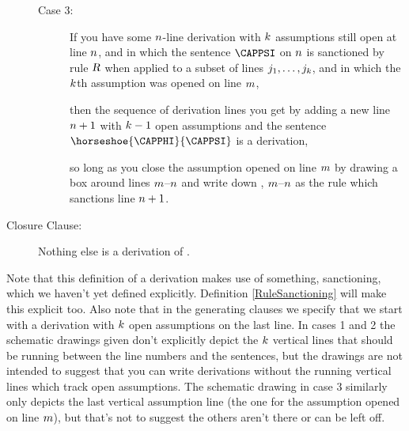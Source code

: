 \begin{majorILnc}{}
\begin{description}
\begin{description}
\item[Case 3:] If you have some $n$-line derivation with $k$ assumptions still open at line $n$, and in which the sentence $\CAPPSI$ on $n$ is sanctioned by rule $\textsl{R}$ when applied to a subset of lines $j_1,\ldots,j_k$, and in which the $k$th assumption was opened on line $m$, 
\begin{gproofnn}
\glinend{}{}{}
\glinend{}{$\qquad\vdots$}{}
\glinend{}{}{}
\galineNCnd{}{}{}
\galineNCnd{}{$\qquad\vdots$}{}
\galineNCnd{}{}{}
\end{gproofnn}
then the sequence of derivation lines you get by adding a new line $n+1$ with $k-1$ open assumptions and the sentence $\horseshoe{\CAPPHI}{\CAPPSI}$ is a derivation,
\begin{gproofnn}
\glinend{}{}{}
\glinend{}{$\qquad\vdots$}{}
\glinend{}{}{}
\end{gproofnn}
so long as you close the assumption opened on line $m$ by drawing a box around lines $m$--$n$ and write down , $m$--$n$ as the rule which sanctions line $n+1$. 
\end{description}

\item[Closure Clause:] Nothing else is a derivation of \GSL{}.
\end{description}
\end{majorILnc}
\noindent{}Note that this definition of a derivation makes use of something, sanctioning, which we haven't yet defined explicitly. 
Definition \ref{RuleSanctioning} will make this explicit too. 
Also note that in the generating clauses we specify that we start with a derivation with $k$ open assumptions on the last line. 
In cases 1 and 2 the schematic drawings given don't explicitly depict the $k$ vertical lines that should be running between the line numbers and the sentences, but the drawings are not intended to suggest that you can write derivations without the running vertical lines which track open assumptions. 
The schematic drawing in case 3 similarly only depicts the last vertical assumption line (the one for the assumption opened on line $m$), but that's not to suggest the others aren't there or can be left off.   

